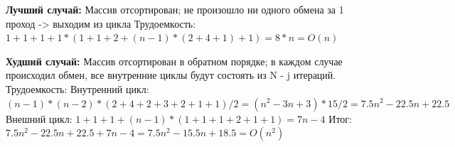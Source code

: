 \documentclass{report}
\begin{document}
 
\textbf{Лучший случай:} Массив отсортирован; не произошло ни одного обмена за 1 проход -> выходим из цикла \newline
Трудоемкость:  $1 + 1 + 1 + 1 * (1 + 1 + 2 + (n - 1) * (2 + 4 + 1) + 1) = 8 * n = O(n)$

\textbf{Худший случай:}  Массив отсортирован в обратном порядке; в каждом случае происходил обмен, все внутренние циклы будут состоять из N - j итераций.\newline
Трудоемкость: 
\newline
Внутренний цикл: $(n - 1) * (n - 2) * (2 + 4 + 2 + 3 + 2 + 1 + 1) / 2 = (n^2 -3n + 3) * 15 / 2 = 7.5n^2 - 22.5n + 22.5$
\newline
Внешний цикл: $1 + 1 + 1 + (n - 1) * (1 + 1 + 1 + 2 + 1 + 1) = 7n - 4$
\newline
Итог: $7.5 n^2 - 22.5n + 22.5 + 7n - 4 = 7.5n^2 - 15.5n + 18.5 = O(n ^ 2)$
\end{document}
